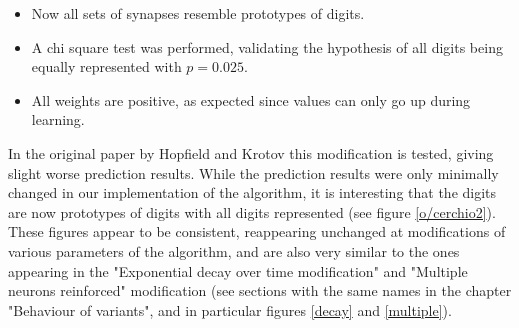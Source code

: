 \documentclass[a4paper]{report}
\begin{document}
\begin{itemize}
    \item Now all sets of synapses resemble prototypes of digits.
    \item A chi square test was performed, validating the hypothesis of all digits being equally represented with $p  = 0.025$.
    \item All weights are positive, as expected since values can only go up during learning.
\end{itemize}

In the original paper by Hopfield and Krotov this modification is tested, giving slight worse prediction results.
While the prediction results were only minimally changed in our implementation of the algorithm, it is interesting that the digits are now prototypes of digits with all digits represented (see figure \ref{o/cerchio2}).
These figures appear to be consistent, reappearing unchanged at modifications of various parameters of the algorithm, and are also very similar to the ones appearing in the "Exponential decay over time modification" and "Multiple neurons reinforced" modification (see sections with the same names in the chapter "Behaviour of variants", and in particular figures \ref{decay} and \ref{multiple}).
\end{document}

